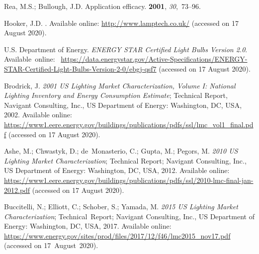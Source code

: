 \documentclass[energies,article,accept,moreauthors,pdftex]{Definitions/mdpi}\usepackage[]{graphicx}\usepackage[]{color}
\begin{document}
\begin{thebibliography}{999}
Rea, M.S.; Bullough, J.D.
\newblock Application efficacy.
 {\bf 2001},
  {\em 30},~73--96.%

Hooker, J.D.
.  Available online: 
\newblock \url{http://www.lamptech.co.uk/}
\newblock (accessed on 17 August 2020).%

{U.S. Department of Energy}.
\newblock \emph{ENERGY STAR Certified Light Bulbs Version 2.0}.
\newblock
  \mbox{Available online: } \url{https://data.energystar.gov/Active-Specifications/ENERGY-STAR-Certified-Light-Bulbs-Version-2-0/ebgj-qsf7}
\newblock (accessed on 17 August 2020).%

Brodrick, J.
\newblock \emph{2001 {US} Lighting Market Characterization, {V}olume {I}:
  National Lighting Inventory and Energy Consumption Estimate};
\newblock Technical Report, Navigant Consulting, Inc., US Department of Energy:
  Washington, DC, USA,  2002.  Available online: 
  \url{https://www1.eere.energy.gov/buildings/publications/pdfs/ssl/lmc_vol1_final.pdf}
\newblock (accessed on 17 August 2020).%

Ashe, M.; Chwastyk, D.; de~Monasterio, C.; Gupta, M.; Pegors, M.
\newblock \emph{2010 {US} Lighting Market Characterization};
\newblock Technical Report; Navigant Consulting, Inc., US Department of Energy:
  Washington, DC, USA,  2012.  Available online: 
  \url{https://www1.eere.energy.gov/buildings/publications/pdfs/ssl/2010-lmc-final-jan-2012.pdf}
\newblock (accessed on 17 August 2020).%

Buccitelli, N.; Elliott, C.; Schober, S.; Yamada, M.
\newblock \emph{2015 {US} Lighting Market Characterization};
\newblock \mbox{Technical Report}; Navigant Consulting, Inc., US Department of Energy:
  Washington, DC, USA,  2017.  Available online: 
  \url{https://www.energy.gov/sites/prod/files/2017/12/f46/lmc2015_nov17.pdf}
\newblock (accessed on \mbox{17 August 2020}).%


\end{thebibliography}
\end{document}

